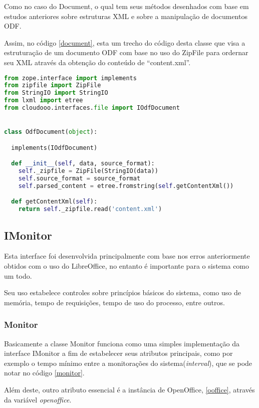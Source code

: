 Como no caso do Document, o qual tem seus métodos desenhados com base em estudos anteriores sobre estruturas XML e sobre a manipulação de documentos ODF.

Assim, no código \ref{document}, esta um trecho do código desta classe que visa a estruturação de um documento ODF com base no uso do ZipFile para ordernar seu XML através da obtenção do conteúdo de ``content.xml''.

{\singlespace
\begin{lstlisting}[caption=Trecho de estruturação do content.xml,language=python,label={document}]
from zope.interface import implements
from zipfile import ZipFile
from StringIO import StringIO
from lxml import etree
from cloudooo.interfaces.file import IOdfDocument


class OdfDocument(object):

  implements(IOdfDocument)

  def __init__(self, data, source_format):
    self._zipfile = ZipFile(StringIO(data))
    self.source_format = source_format
    self.parsed_content = etree.fromstring(self.getContentXml())

  def getContentXml(self):
    return self._zipfile.read('content.xml')
\end{lstlisting}
}


\subsection{IMonitor}

Esta interface foi desenvolvida principalmente com base nos erros anteriormente obtidos com o uso do LibreOffice, no entanto é importante para o sistema como um todo.

Seu uso estabelece controles sobre princípios básicos do sistema, como uso de memória, tempo de requisições, tempo de uso do processo, entre outros.


\subsubsection{Monitor}
\label{mon}

Basicamente a classe Monitor funciona como uma simples implementação da interface IMonitor a fim de estabelecer seus atributos principais, como por exemplo o tempo mínimo entre a monitorações do sistema(\textit{interval}), que se pode notar no código \ref{monitor}. 

Além deste, outro atributo essencial é a instância de OpenOffice, \ref{ooffice}, através da variável \textit{openoffice}.

